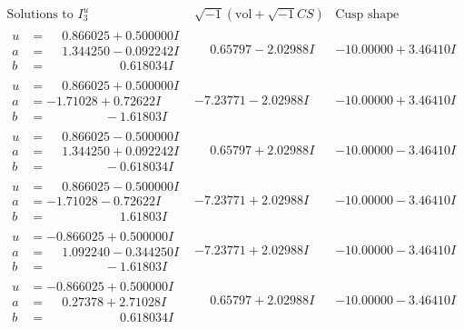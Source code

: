 \documentclass[1p]{elsarticle_modified}
\theoremstyle{definition}
\newcommand{\I}{\sqrt{-1}}
\begin{document}
$$\begin{array}{c|c|c}  
\text{Solutions to }I^u_{3}& \I (\text{vol} + \sqrt{-1}CS) & \text{Cusp shape}\\
 \hline 
\begin{aligned}
u &= \phantom{-}0.866025 + 0.500000 I \\
a &= \phantom{-}1.344250 - 0.092242 I \\
b &= \phantom{-0.000000 -}0.618034 I\end{aligned}
 & \phantom{-}0.65797 - 2.02988 I & -10.00000 + 3.46410 I \\ \hline\begin{aligned}
u &= \phantom{-}0.866025 + 0.500000 I \\
a &= -1.71028 + 0.72622 I \\
b &= \phantom{-0.000000 } -1.61803 I\end{aligned}
 & -7.23771 - 2.02988 I & -10.00000 + 3.46410 I \\ \hline\begin{aligned}
u &= \phantom{-}0.866025 - 0.500000 I \\
a &= \phantom{-}1.344250 + 0.092242 I \\
b &= \phantom{-0.000000 } -0.618034 I\end{aligned}
 & \phantom{-}0.65797 + 2.02988 I & -10.00000 - 3.46410 I \\ \hline\begin{aligned}
u &= \phantom{-}0.866025 - 0.500000 I \\
a &= -1.71028 - 0.72622 I \\
b &= \phantom{-0.000000 -}1.61803 I\end{aligned}
 & -7.23771 + 2.02988 I & -10.00000 - 3.46410 I \\ \hline\begin{aligned}
u &= -0.866025 + 0.500000 I \\
a &= \phantom{-}1.092240 - 0.344250 I \\
b &= \phantom{-0.000000 } -1.61803 I\end{aligned}
 & -7.23771 + 2.02988 I & -10.00000 - 3.46410 I \\ \hline\begin{aligned}
u &= -0.866025 + 0.500000 I \\
a &= \phantom{-}0.27378 + 2.71028 I \\
b &= \phantom{-0.000000 -}0.618034 I\end{aligned}
 & \phantom{-}0.65797 + 2.02988 I & -10.00000 - 3.46410 I \\ \hline\begin{aligned}

\end{aligned}
\end{array}$$
\end{document}
